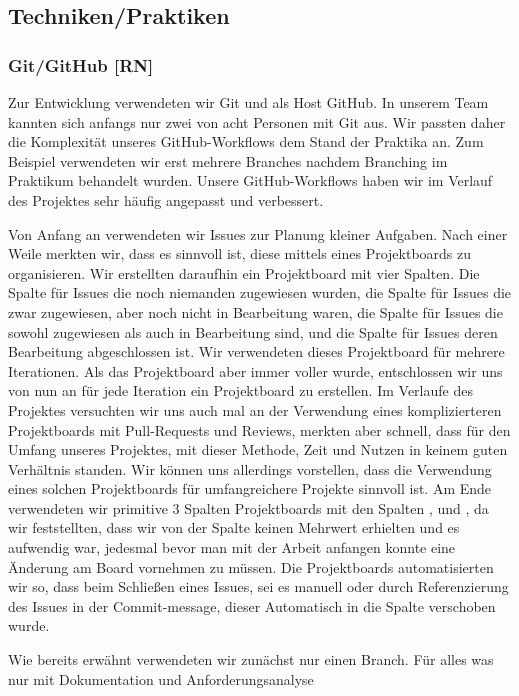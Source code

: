 \documentclass[10pt]{article}
\begin{document}
\subsection{Techniken/Praktiken}
\subsubsection{Git/GitHub [RN]}
Zur Entwicklung verwendeten wir Git und als Host GitHub. In unserem Team kannten sich anfangs nur zwei von acht Personen
mit Git aus. Wir passten daher die Komplexität unseres GitHub-Workflows dem Stand der Praktika an. Zum Beispiel
verwendeten wir erst mehrere Branches nachdem Branching im Praktikum behandelt wurden. Unsere GitHub-Workflows haben
wir im Verlauf des Projektes sehr häufig angepasst und verbessert.\par
\medskip
Von Anfang an verwendeten wir Issues zur Planung kleiner Aufgaben. Nach einer Weile merkten wir, dass es sinnvoll
ist, diese mittels eines Projektboards zu organisieren. Wir erstellten daraufhin ein Projektboard mit vier Spalten.
Die Spalte  für Issues die noch niemanden zugewiesen wurden, die Spalte  für Issues die
zwar zugewiesen, aber noch nicht in Bearbeitung waren, die Spalte  für Issues die sowohl zugewiesen
als auch in Bearbeitung sind, und die Spalte  für Issues deren Bearbeitung abgeschlossen ist.
Wir verwendeten dieses Projektboard für mehrere Iterationen. Als das Projektboard aber immer voller wurde, entschlossen wir uns
von nun an für jede Iteration ein Projektboard zu erstellen. Im Verlaufe des Projektes versuchten wir uns auch mal
an der Verwendung eines komplizierteren Projektboards mit Pull-Requests und Reviews, merkten aber schnell, dass
für den Umfang unseres Projektes, mit dieser Methode, Zeit und Nutzen in keinem guten Verhältnis standen.
Wir können uns allerdings vorstellen, dass die Verwendung eines solchen Projektboards für umfangreichere Projekte
sinnvoll ist. Am Ende verwendeten wir primitive 3 Spalten Projektboards mit den Spalten ,  und
, da wir feststellten, dass wir von der Spalte  keinen Mehrwert erhielten und es aufwendig
war, jedesmal bevor man mit der Arbeit anfangen konnte eine Änderung am Board vornehmen zu müssen. Die Projektboards
automatisierten wir so, dass beim Schließen eines Issues, sei es manuell oder durch Referenzierung des Issues in
der Commit-message, dieser Automatisch in die Spalte  verschoben wurde.\par
\medskip
Wie bereits erwähnt verwendeten wir zunächst nur einen Branch. Für alles was nur mit Dokumentation und Anforderungsanalyse
\end{document}
